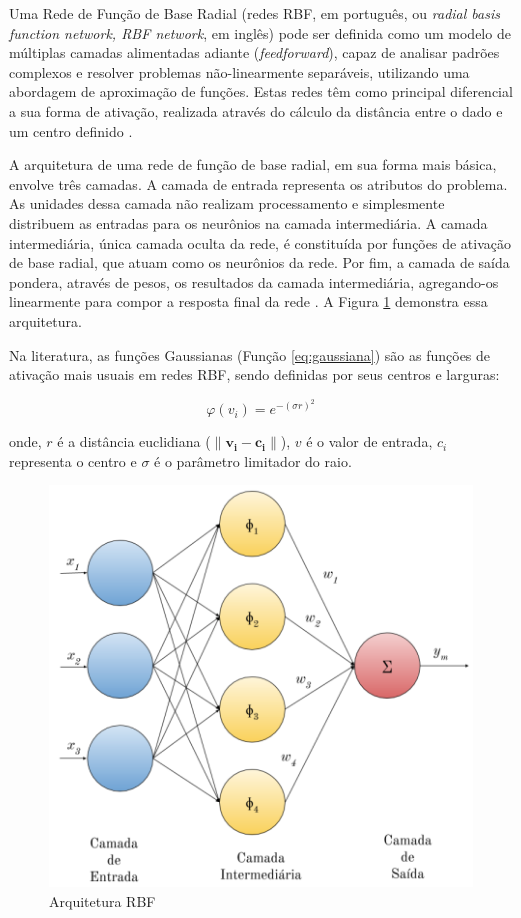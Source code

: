 \documentclass[msc, classic, a4paper]{ufbathesis}
\begin{document}
Uma Rede de Função de Base Radial (redes RBF, em português,  ou \textit{radial basis function network, RBF network}, em inglês) pode ser definida como um modelo de múltiplas camadas alimentadas adiante (\textit{feedforward}),
capaz de analisar padrões complexos e resolver problemas não-linearmente separáveis, utilizando uma abordagem de aproximação de funções.
Estas redes têm como principal diferencial a sua forma de ativação, realizada através do cálculo da distância entre o dado e um centro definido \cite{Braga:RedesNeuraisTeoriaAplicacoes}.

A arquitetura de uma rede de função de base radial, em sua forma mais básica, envolve três camadas.
A camada de entrada representa os atributos do problema. As unidades dessa camada não realizam processamento e simplesmente distribuem as entradas para os neurônios na camada intermediária.
A camada intermediária, única camada oculta da rede, é constituída por funções de ativação de base radial, que atuam como os neurônios da rede.
Por fim, a camada de saída pondera, através de pesos, os resultados da camada intermediária, agregando-os linearmente para compor a resposta final da rede \cite{Rojas:1996:NNS:235222}.
A Figura \ref{fig:rbg_arq} demonstra essa arquitetura.

Na literatura, as funções Gaussianas (Função \ref{eq:gaussiana}) são as funções de ativação mais usuais em redes RBF, sendo definidas por seus centros e larguras:

\begin{equation}
    \label{eq:gaussiana}
    \varphi (v_{i})=e^{-(\sigma r)^{2}}
\end{equation}

onde, $r$ é a distância euclidiana ($\|\mathbf {v_{i}} - \mathbf {c_{i}}\|$), $v$ é o valor de entrada, $c_i$ representa o centro e $\sigma$ é o parâmetro limitador do raio.

\begin{figure}[H]
\begin{center}
    \includegraphics[scale=1]{imagens/rbf_arq.png}
    \caption{Arquitetura RBF}
    \label{fig:rbg_arq}
\end{center}
\end{figure}
\end{document}
